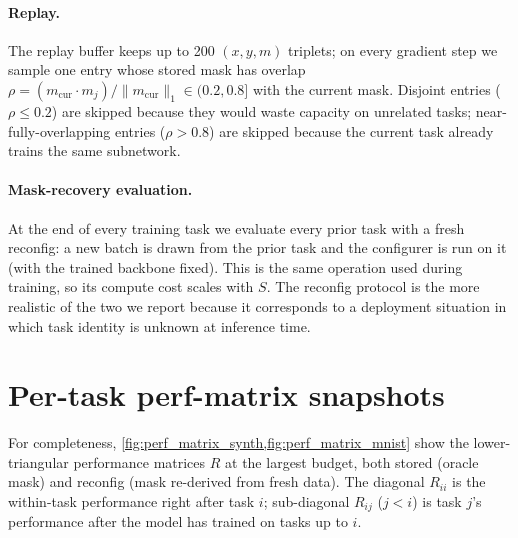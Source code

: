 \documentclass{article}
\theoremstyle{plain}
\theoremstyle{remark}
\begin{document}
\paragraph{Replay.}
The replay buffer keeps up to 200 $(x,y,m)$ triplets; on every
gradient step we sample one entry whose stored mask has overlap
$\rho=(m_\mathrm{cur}\cdot m_j)/\|m_\mathrm{cur}\|_1\in(0.2,0.8]$ with
the current mask. Disjoint entries ($\rho\le 0.2$) are skipped because
they would waste capacity on unrelated tasks; near-fully-overlapping
entries ($\rho>0.8$) are skipped because the current task already
trains the same subnetwork.

\paragraph{Mask-recovery evaluation.}
At the end of every training task we evaluate every prior task with a
fresh reconfig: a new batch is drawn from the prior task and the
configurer is run on it (with the trained backbone fixed). This is the
same operation used during training, so its compute cost scales with
$S$. The reconfig protocol is the more realistic of the two we report
because it corresponds to a deployment situation in which task
identity is unknown at inference time.

\section{Per-task perf-matrix snapshots}
\label{app:perf_matrix}

For completeness, \cref{fig:perf_matrix_synth,fig:perf_matrix_mnist}
show the lower-triangular performance matrices $R$ at the largest
budget, both stored (oracle mask) and reconfig (mask re-derived from
fresh data). The diagonal $R_{ii}$ is the within-task performance
right after task $i$; sub-diagonal $R_{ij}$ ($j<i$) is task $j$'s
performance after the model has trained on tasks up to $i$.
\end{document}
